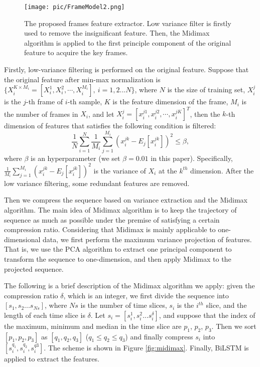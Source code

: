 \documentclass{article}
\begin{document}
\begin{figure}[!t]
	\centering
	\texttt{[image: pic/FrameModel2.png]}
	\caption{The proposed frames feature extractor. Low variance filter is firstly used to remove the insignificant feature. Then, the Midimax algorithm is applied to the first principle component of the original feature to acquire the key frames.}
	\label{fig:frame}
\end{figure}

Firstly, low-variance filtering is performed on the original feature. Suppose that the original feature after min-max normalization is $\{X^{K \times M_i}_i=[X_i^1,X_i^2,\cdots,X_i^{M_i}],\ i=1,2...N\}$, where $N$ is the size of training set, $X_i^j$ is the $j$-th frame of $i$-th sample, $K$ is the feature dimension of the frame, $M_i$ is the number of frames in $X_i$, and let $X_i^{j}=[x_i^{j1}, x_i^{j2}, \cdots, x_i^{jK}]^T$, then the $k$-th dimension of features that satisfies the following condition is filtered:
\begin{equation}
\frac{1}{N}\sum_{i=1}^N \frac{1}{M_i}\sum_{j=1}^{M_i} (x_i^{jk}-E_j[x_i^{jk}])^2 \leq \beta,
\end{equation}
where $\beta$ is an hyperparameter (we set $\beta=0.01$ in this paper).
Specifically,  $\frac{1}{M_i}\sum_{j=1}^{M_i} \left(x_i^{jk}-E_j[x_i^{jk}]\right)^2$ is the variance of $X_i$ at the $k^{th}$ dimension.
After the low variance filtering, some redundant features are removed.

Then we compress the sequence based on variance extraction and the Midimax algorithm. The main idea of Midimax algorithm is to keep the trajectory of sequence as much as possible under the premise of satisfying a certain compression ratio. Considering that Midimax is mainly applicable to one-dimensional data, we first perform the maximum variance projection of features. That is, we use the PCA algorithm to extract one principal component to transform the sequence to one-dimension, and then apply Midimax to the projected sequence.

The following is a brief description of the Midimax algorithm we apply: given the compression ratio $\delta$, which is an integer, we first divide the sequence into $[s_1,s_2...s_{Ns}]$, where $Ns$ is the number of time slices, $s_i$ is the $i^{th}$ slice, and the length of each time slice is $\delta$. Let $s_i=[s_i^1,s_i^2...s_i^{\delta}]$, and suppose that the index of the maximum, minimum and median in the time slice are $p_1$, $p_2$, $p_3$. Then we sort $[p_1,p_2,p_3]$ as $[q_1,q_2,q_3]$ ($q_1\leq q_2\leq q_3$) and finally compress $s_i$ into $[s_i^{q_1},s_i^{q_2},s_i^{q3}]$. The scheme is shown in Figure \ref{fig:midimax}. Finally, BiLSTM is applied to extract the features.
\end{document}
